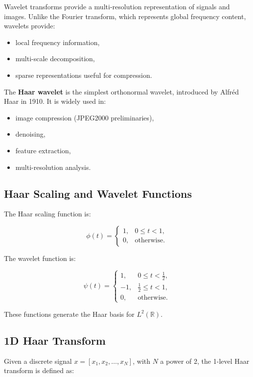 \documentclass{AnantDocumentation}
\begin{document}
Wavelet transforms provide a multi-resolution representation of signals and images.  
Unlike the Fourier transform, which represents global frequency content, wavelets provide:

\begin{itemize}
\item local frequency information,
\item multi-scale decomposition,
\item sparse representations useful for compression.
\end{itemize}

The \textbf{Haar wavelet} is the simplest orthonormal wavelet, introduced by Alfréd Haar in 1910.  
It is widely used in:

\begin{itemize}
\item image compression (JPEG2000 preliminaries),
\item denoising,
\item feature extraction,
\item multi-resolution analysis.
\end{itemize}

\subsection{Haar Scaling and Wavelet Functions}

The Haar scaling function is:

\[
\phi(t) =
\begin{cases}
1, & 0 \le t < 1, \\
0, & \text{otherwise}.
\end{cases}
\]

The wavelet function is:

\[
\psi(t) =
\begin{cases}
1, & 0 \le t < \frac{1}{2}, \\
-1, & \frac{1}{2} \le t < 1, \\
0, & \text{otherwise}.
\end{cases}
\]

These functions generate the Haar basis for $L^2(\mathbb{R})$.

\subsection{1D Haar Transform}

Given a discrete signal $x = [x_1, x_2, \ldots, x_N]$, with $N$ a power of 2, the 1-level Haar transform is defined as:
\end{document}
